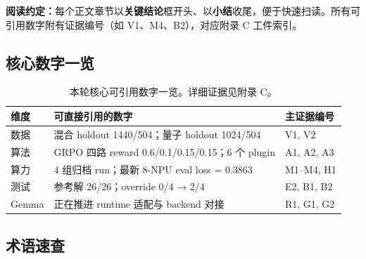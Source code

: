 \documentclass[11pt,a4paper]{article}
\begin{document}
\noindent\textbf{阅读约定：}每个正文章节以\textbf{关键结论}框开头、以\textbf{小结}收尾，便于快速扫读。所有可引用数字附有证据编号（如 V1、M4、B2），对应附录 C 工件索引。

\subsection{核心数字一览}

\begin{table}[htbp]
\centering
\small
\begin{tabularx}{\textwidth}{p{1.8cm} p{3.8cm} Y}
\toprule
维度 & 可直接引用的数字 & 主证据编号 \\
\midrule
数据 & 混合 holdout 1440/504；量子 holdout 1024/504 & V1, V2 \\
算法 & GRPO 四路 reward 0.6/0.1/0.15/0.15；6 个 plugin & A1, A2, A3 \\
算力 & 4 组归档 run；最新 8-NPU eval loss = 0.3863 & M1--M4, H1 \\
测试 & 参考解 26/26；override 0/4 → 2/4 & E2, B1, B2 \\
Gemma & 正在推进 runtime 适配与 backend 对接 & R1, G1, G2 \\
\bottomrule
\end{tabularx}
\caption{本轮核心可引用数字一览。详细证据见附录 C。}
\label{tab:executive-summary}
\end{table}

\subsection{术语速查}
\end{document}
